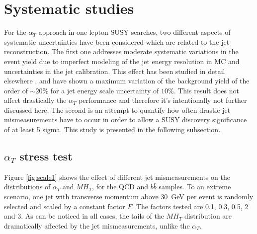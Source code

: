 \section{Systematic studies}

For the $\alpha_{T}$ approach in one-lepton SUSY searches, two different aspects of systematic uncertainties have been considered which are related to the jet reconstruction. The first one addresses moderate systematic variations in the event yield due to imperfect modeling of the jet energy resolution in MC and uncertainties in the jet calibration. This effect has been studied in detail elsewhere \cite{njet}, and have shown a maximum variation of the background yield of the order of $\sim 20 \%$ for a jet energy scale uncertainty of $10 \%$. This result does not affect drastically the $\alpha_{T}$ performance and therefore it's intentionally not further discussed here. The second is an attempt to quantify how often drastic jet mismeasurements have to occur in order to allow a SUSY discovery significance of at least 5 sigma. This study is presented in the following subsection.


\subsection{$\alpha_{T}$ stress test}

Figure \ref{fig:scale1} shows the effect of different jet mismeasurements on the distributions of $\alpha_{T}$ and $MH_{T}$, for the QCD and $b\bar{b}$ samples. To an extreme scenario, one jet with transverse momentum above 30~GeV per event is randomly selected and scaled by a constant factor $F$. The factors tested are 0.1, 0.3, 0.5, 2 and 3. As can be noticed in all cases, the tails of the $MH_{T}$ distribution are dramatically affected by the jet mismeasurements, unlike the $\alpha_{T}$. 

